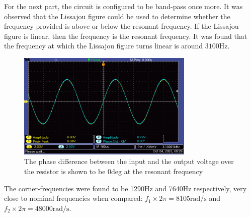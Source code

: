 For the next part, the circuit is configured to be band-pass once more. It was observed that the Lissajou figure could be used to determine whether the frequency provided is above or below the resonant frequency. If the Lissajou figure is linear, then the frequency is the resonant frequency. It was found that the frequency at which the Lissajou figure turns linear is around $3100\text{Hz}$.

\begin{figure}[H]
    \centering
    \includegraphics[width=0.75\textwidth]{images/prelab/phase_V_R.png}
    \caption{The phase difference between the input and the output voltage over the resistor is shown to be 0deg at the resonant frequency}
\end{figure}

The corner-frequencies were found to be 1290Hz and 7640Hz respectively,
very close to nominal frequencies when compared:
$f_1 \times 2\pi = 8105\text{rad/s}$ and $f_2 \times 2\pi = 48000\text{rad/s}$.